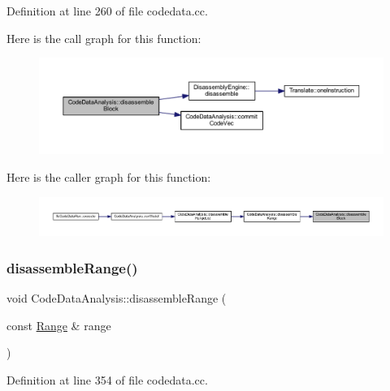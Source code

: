 Definition at line 260 of file codedata.\+cc.

Here is the call graph for this function\+:
\nopagebreak
\begin{figure}[H]
\begin{center}
\leavevmode
\includegraphics[width=350pt]{class_code_data_analysis_adee07d792d5bf97891fb5d79c3c44d3a_cgraph}
\end{center}
\end{figure}
Here is the caller graph for this function\+:
\nopagebreak
\begin{figure}[H]
\begin{center}
\leavevmode
\includegraphics[width=350pt]{class_code_data_analysis_adee07d792d5bf97891fb5d79c3c44d3a_icgraph}
\end{center}
\end{figure}
\mbox{\label{class_code_data_analysis_a723b35a19d5263fbcc3ed8b31e244758}} 
\subsubsection{\texorpdfstring{disassembleRange()}{disassembleRange()}}
{\footnotesize\ttfamily void Code\+Data\+Analysis\+::disassemble\+Range (\begin{DoxyParamCaption}\item[{const \mbox{\hyperlink{class_range}{Range}} \&}]{range }\end{DoxyParamCaption})}



Definition at line 354 of file codedata.\+cc.

